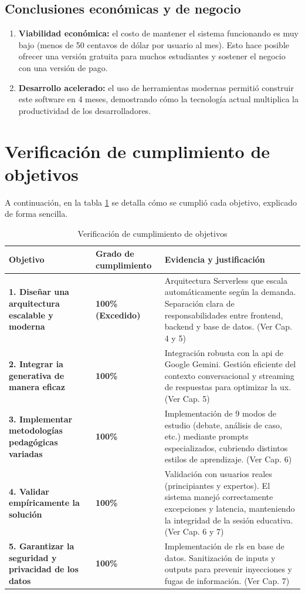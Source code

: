 \subsection{Conclusiones económicas y de negocio}
\begin{enumerate}
\item \textbf{Viabilidad económica:} el costo de mantener el sistema funcionando es muy bajo (menos de 50 centavos de dólar por usuario al mes). Esto hace posible ofrecer una versión gratuita para muchos estudiantes y sostener el negocio con una versión de pago.
\item \textbf{Desarrollo acelerado:} el uso de herramientas modernas permitió construir este software en 4 meses, demostrando cómo la tecnología actual multiplica la productividad de los desarrolladores.
\end{enumerate}

\section{Verificación de cumplimiento de objetivos}

A continuación, en la tabla \ref{tab:objetivos} se detalla cómo se cumplió cada objetivo, explicado de forma sencilla.

\begin{table}[h]
\centering
\begin{tabularx}{\textwidth}{|p{4cm}|p{4cm}|X|}
\hline
\textbf{Objetivo} & \textbf{Grado de cumplimiento} & \textbf{Evidencia y justificación} \\
\hline
\textbf{1. Diseñar una arquitectura escalable y moderna} & \textbf{100\% (Excedido)} & Arquitectura Serverless que escala automáticamente según la demanda. Separación clara de responsabilidades entre frontend, backend y base de datos. (Ver Cap. 4 y 5) \\
\hline
\textbf{2. Integrar \gls{ia} generativa de manera eficaz} & \textbf{100\%} & Integración robusta con la \gls{api} de Google Gemini. Gestión eficiente del contexto conversacional y streaming de respuestas para optimizar la \gls{ux}. (Ver Cap. 5) \\
\hline
\textbf{3. Implementar metodologías pedagógicas variadas} & \textbf{100\%} & Implementación de 9 modos de estudio (debate, análisis de caso, etc.) mediante prompts especializados, cubriendo distintos estilos de aprendizaje. (Ver Cap. 6) \\
\hline
\textbf{4. Validar empíricamente la solución} & \textbf{100\%} & Validación con usuarios reales (principiantes y expertos). El sistema manejó correctamente excepciones y latencia, manteniendo la integridad de la sesión educativa. (Ver Cap. 6 y 7) \\
\hline
\textbf{5. Garantizar la seguridad y privacidad de los datos} & \textbf{100\%} & Implementación de \gls{rls} en base de datos. Sanitización de inputs y outputs para prevenir inyecciones y fugas de información. (Ver Cap. 7) \\
\hline
\end{tabularx}
\caption{Verificación de cumplimiento de objetivos}
\label{tab:objetivos}
\end{table}

